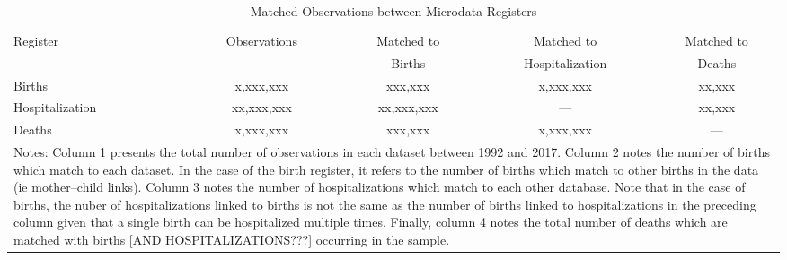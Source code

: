 \documentclass[11pt]{article}
\begin{document}
\begin{appendices}
  \begin{table}[htpb!]
    \centering
    \caption{Matched Observations between Microdata Registers}
    \begin{tabular}{lcccc} \toprule
      Register & Observations & Matched to & Matched to  & Matched to \\
               &              & Births     & Hospitalization & Deaths \\ \midrule
      Births          & x,xxx,xxx  & xxx,xxx    & x,xxx,xxx & xx,xxx \\
      Hospitalization & xx,xxx,xxx & xx,xxx,xxx & ---       & xx,xxx \\
      Deaths          & x,xxx,xxx  & xxx,xxx    & x,xxx,xxx & ---    \\ \midrule
      \multicolumn{5}{p{12.4cm}}{\footnotesize Notes: Column 1 presents the
        total number of observations in each dataset between 1992 and 2017.
        Column 2 notes the number of births which match to each dataset.  In the
        case of the birth register, it refers to the number of births which match
        to other births in the data (ie mother--child links). Column 3 notes the
        number of hospitalizations which match to each other database.  Note that
        in the case of births, the nuber of hospitalizations linked to births is not
        the same as the number of births linked to hospitalizations in the preceding
        column given that a single birth can be hospitalized multiple times.  Finally,
        column 4 notes the total number of deaths which are matched with births
        [AND HOSPITALIZATIONS???] occurring in the sample.}
    \end{tabular}
  \end{table}



\end{appendices}
\end{document}
